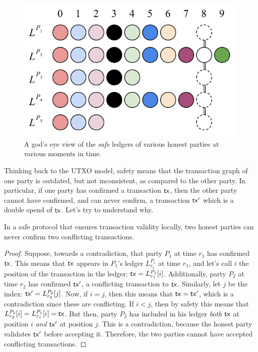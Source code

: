 \begin{figure}[h]
    \centering
    \includegraphics[width=0.65 \columnwidth,keepaspectratio]{figures/safe-ledgers.pdf}
    \caption{A god's eye view of the \emph{safe} ledgers of various honest parties at various moments in time.}
    \label{fig.safe-ledgers}
\end{figure}

Thinking back to the UTXO model, safety means that the transaction graph of one party is outdated, but not inconsistent, as compared
to the other party. In particular, if one party has confirmed a transaction $\mathsf{tx}$, then the other party cannot have confirmed, and can
never confirm, a transaction $\mathsf{tx}'$ which is a double spend of $\mathsf{tx}$. Let's try to understand why.

\begin{lemma}
In a safe protocol that ensures transaction validity locally,
two honest parties can never confirm two conflicting transactions.
\end{lemma}
\begin{proof}
Suppose, towards a contradiction, that party $P_1$ at time $r_1$ has confirmed $\mathsf{tx}$. This means that $\mathsf{tx}$ appears in $P_1$'s
ledger $L^{P_1}_{r_1}$ at time $r_1$, and let's call $i$ the position of the transaction in the ledger: $\mathsf{tx} = L^{P_1}_{r_1}[i]$.
Additionally, party $P_2$ at time $r_2$ has confirmed $\mathsf{tx}'$, a conflicting transaction to $\mathsf{tx}$. Similarly, let $j$ be the index:
$\mathsf{tx}' = L^{P_2}_{r_2}[j]$. Now, if $i = j$, then this means that $\mathsf{tx} = \mathsf{tx}'$, which is a contradiction since these are conflicting.
If $i < j$, then by safety this means that $L^{P_2}_{r_2}[i] = L^{P_1}_{r_1}[i] = \mathsf{tx}$. But then, party $P_2$ has included
in his ledger \emph{both} $\mathsf{tx}$ at position $i$ \emph{and} $\mathsf{tx}'$ at position $j$. This is a contradiction, because the honest
party validates $\mathsf{tx}'$ before accepting it. Therefore, the two parties cannot have accepted conflicting transactions.
\end{proof}

